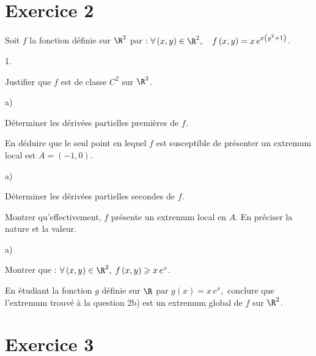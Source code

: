 \documentclass[11pt]{article}%
\begin{document}
\section*{Exercice 2}

Soit $f$ la fonction définie sur $\R^{2}$ par : $\forall \left(
x,y\right) \in \R^{2},\quad f\left( x,y\right) = x\,e^{x\left(
y^{2} + 1\right) }$.

\begin{noliste}{1.}
 \setlength{\itemsep}{4mm}
\item Justifier que $f$ est de classe $C^{2}$ sur $\R^{2}$.

\item 

\begin{noliste}{a)}
 \setlength{\itemsep}{2mm}
\item Déterminer les dérivées partielles premières de $f$.

\item En déduire que le seul point en lequel $f$ est susceptible de
présenter un extremum local est $A = \left( -1,0\right) $.
\end{noliste}

\item 

\begin{noliste}{a)}
 \setlength{\itemsep}{2mm}
\item Déterminer les dérivées partielles secondes de $f$.

\item Montrer qu'effectivement, $f$ présente un extremum local en $A$.
En préciser la nature et la valeur.
\end{noliste}

\item 

\begin{noliste}{a)}
 \setlength{\itemsep}{2mm}
\item Montrer que : $\forall \left( x,y\right) \in \R^{2},\;f\left(
x,y\right) \geq x\,e^{x}$.

\item En étudiant la fonction $g$ définie sur $\R$ par $g\left(
x\right) = x\,e^{x},$ conclure que l'extremum trouvé à la question 2b)
est un
extremum global de $f$ sur $\R^{2}$.
\end{noliste}
\end{noliste}

\section*{Exercice 3}
\end{document}
